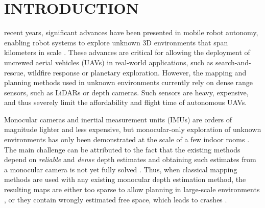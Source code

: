 \documentclass[letterpaper, 10 pt, journal, twoside]{IEEEtran}
\begin{document}
\section{INTRODUCTION}
 recent years, significant advances have been presented in mobile robot autonomy, enabling robot systems to explore unknown 3D environments that span kilometers in scale \cite{darpa_cerberus_wins, csiro_darpa, beneath}. 
These advances are critical for allowing the deployment of uncrewed aerial vehicles (UAVs) in real-world applications, such as search-and-rescue, wildfire response or planetary exploration.
However, the mapping and planning methods used in unknown environments currently rely on dense range sensors, such as LiDARs or depth cameras.
Such sensors are heavy, expensive, and thus severely limit the affordability and flight time of autonomous UAVs.


{Monocular cameras and inertial measurement units (IMUs) are orders of magnitude lighter and less expensive, but monocular-only exploration of unknown environments has only been demonstrated at the scale of a few indoor rooms \cite{from_monoslam_to_explo, los_maps, simon2023mononav, cnn_explo_singleroom}.
The main challenge can be attributed to the fact that the existing methods depend on \textit{reliable} and \textit{dense} depth estimates and obtaining such estimates from a monocular camera is not yet fully solved \cite{deep_mono_depth_2021, monodepth_survey_big_2024}.
Thus, when classical mapping methods are used with any existing monocular depth estimation method, the resulting maps are either too sparse to allow planning in large-scale environments \cite{from_monoslam_to_explo, los_maps}, or they contain wrongly estimated free space, which leads to crashes \cite{simon2023mononav, mono_airsim_nav_2025}.
}
\end{document}
